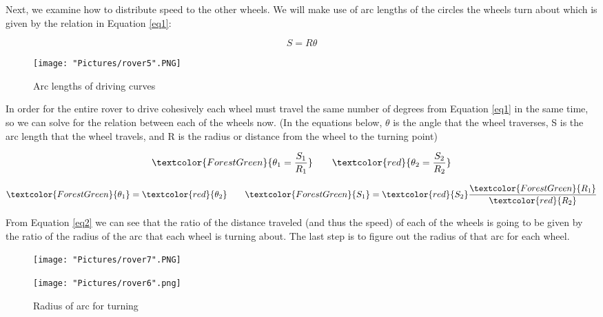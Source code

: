 \documentclass[12pt]{article}
\begin{document}
\noindent Next, we examine how to distribute speed to the other wheels. We will make use of arc lengths of the circles the wheels turn about which is given by the relation in Equation \ref{eq1}:

\begin{equation}
	S = R  \theta
	\label{eq1}
\end{equation}

\begin{figure}[H]
 	\centering
	\texttt{[image: "Pictures/rover5".PNG]}
 	\caption{Arc lengths of driving curves}
	\label{r3}
\end{figure}

\noindent In order for the entire rover to drive cohesively each wheel must travel the same number of degrees from Equation \ref{eq1} in the same time, so we can solve for the relation between each of the wheels now. (In the equations below, $\theta$ is the angle that the wheel traverses, S is the arc length that the wheel travels, and R is the radius or distance from the wheel to the turning point)

\begin{equation}
	\textcolor{ForestGreen}{\theta_1 = \frac{S_1}{R_1}} \qquad \textcolor{red}{\theta_2 = \frac{S_2}{R_2}}
\end{equation}

\begin{equation}
	\textcolor{ForestGreen}{\theta_1} = \textcolor{red}{\theta_2} \qquad \textcolor{ForestGreen}{S_1}=\textcolor{red}{S_2} \frac{\textcolor{ForestGreen}{R_1}}{\textcolor{red}{R_2}}
	\label{eq2}
\end{equation}

\noindent From Equation \ref{eq2} we can see that the ratio of the distance traveled (and thus the speed) of each of the wheels is going to be given by the ratio of the radius of the arc that each wheel is turning about. The last step is to figure out the radius of that arc for each wheel. 

\begin{figure}[H]
 	\centering
  	\begin{minipage}[b]{0.45\textwidth}
		\texttt{[image: "Pictures/rover7".PNG]}
  	\end{minipage}
  	\hfill
  	\begin{minipage}[b]{0.45\textwidth}
    		\texttt{[image: "Pictures/rover6".png]}
  	\end{minipage}
  	\caption{Radius of arc for turning}
	\label{r4}
\end{figure}
\end{document}
